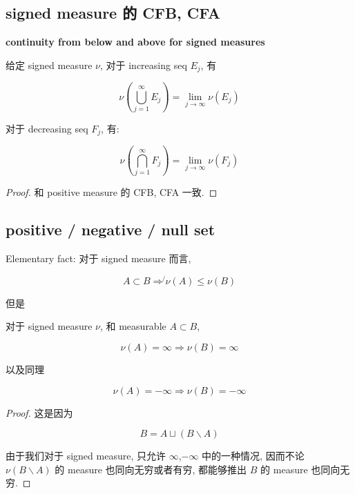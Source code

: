 \documentclass{qlnotes-export}
\begin{document}
\subsection{signed measure 的 CFB, CFA}\label{signed-measure-ux7684-cfb-cfa}

\begin{proposition}{\protect{}\label{kn-continuity-of-signed-measures}{\textbf{continuity
from below and above for signed measures}}}

给定 signed measure \(\nu\), 对于 increasing seq \(E_{j}\), 有

\[\nu(\bigcup\limits_{j = 1}^{\infty}E_{j}) = \lim\limits_{j\rightarrow\infty}\nu(E_{j})\]

对于 decreasing seq \(F_{j}\), 有:

\[\nu(\bigcap\limits_{j = 1}^{\infty}F_{j}) = \lim\limits_{j\rightarrow\infty}\nu(F_{j})\]

\end{proposition}

\begin{proof}

和 positive measure 的 CFB, CFA 一致.

\end{proof}

\subsection{positive / negative / null set}\label{positive-negative-null-set}

Elementary fact: 对于 signed measure 而言,

\[A \subset B\operatorname{\Rightarrow\not{}}\nu(A) \leq \nu(B)\]

但是

\begin{lemma}

对于 signed measure \(\nu\), 和 measurable \(A \subset B\),

\[\nu(A) = \infty\Longrightarrow\nu(B) = \infty\]

以及同理

\[\nu(A) = - \infty\Longrightarrow\nu(B) = - \infty\]

\end{lemma}

\begin{proof}

这是因为

\[B = A \sqcup (B\backslash A)\]

由于我们对于 signed measure, 只允许 \(\infty\),\(- \infty\) 中的一种情况, 因而不论 \(\nu(B\backslash A)\) 的 measure 也同向无穷或者有穷, 都能够推出 \(B\) 的 measure 也同向无穷.

\end{proof}
\end{document}
